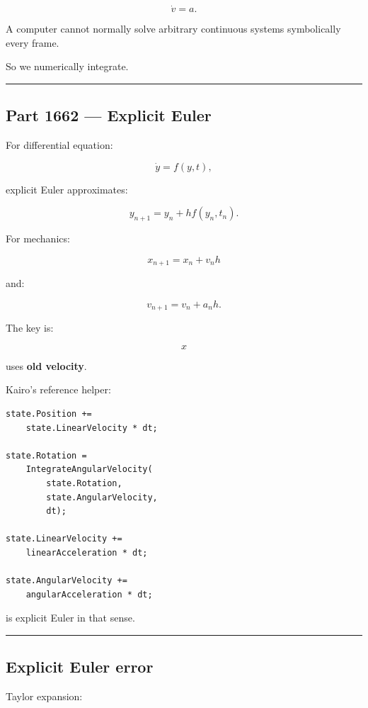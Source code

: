 \[
\dot v=a.
\]

A computer cannot normally solve arbitrary continuous systems symbolically every frame.

So we numerically integrate.

\begin{center}\rule{0.5\linewidth}{0.5pt}\end{center}

\subsection{Part 1662 --- Explicit Euler}\label{06-engine-ii-ch037-part-1662-explicit-euler}

For differential equation:

\[
\dot y=f(y,t),
\]

explicit Euler approximates:

\[
\boxed{
y_{n+1}
=
y_n+
h f(y_n,t_n).
}
\]

For mechanics:

\[
x_{n+1}
=
x_n+
v_nh
\]

and:

\[
v_{n+1}
=
v_n+
a_nh.
\]

The key is:

\[
x
\]

uses \textbf{old velocity}.

Kairo's reference helper:

\begin{verbatim}
state.Position +=
    state.LinearVelocity * dt;

state.Rotation =
    IntegrateAngularVelocity(
        state.Rotation,
        state.AngularVelocity,
        dt);

state.LinearVelocity +=
    linearAcceleration * dt;

state.AngularVelocity +=
    angularAcceleration * dt;
\end{verbatim}

is explicit Euler in that sense.

\begin{center}\rule{0.5\linewidth}{0.5pt}\end{center}

\subsection{Explicit Euler error}\label{06-engine-ii-ch037-explicit-euler-error}

Taylor expansion:

